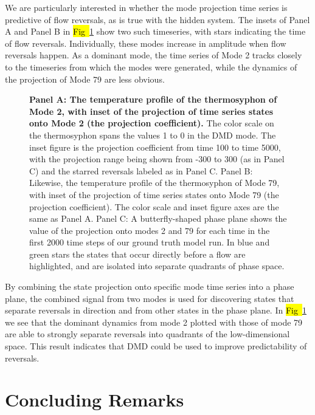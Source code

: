 \documentclass[10pt,letterpaper]{article}
\begin{document}
We are particularly interested in whether the mode projection time series is predictive of flow reversals, as is true with the hidden system.
The insets of Panel A and Panel B in \hl{Fig~}\ref{fig:DMD_phaseplane} show two such timeseries, with stars indicating the time of flow reversals.
Individually, these modes increase in amplitude when flow reversals happen.
As a dominant mode, the time series of Mode 2 tracks closely to the timeseries from which the modes were generated, while the dynamics of the projection of Mode 79 are less obvious.

\begin{figure}[h]
  \centering
  \caption[]{
\textbf{    Panel A: The temperature profile of the thermosyphon of Mode 2, with inset of the projection of time series states onto Mode 2 (the projection coefficient).
}    The color scale on the thermosyphon spans the values 1 to 0 in the DMD mode.
    The inset figure is the projection coefficient from time 100 to time 5000, with the projection range being shown from -300 to 300 (as in Panel C) and the starred reversals labeled as in Panel C.
    Panel B: Likewise, the temperature profile of the thermosyphon of Mode 79, with inset of the projection of time series states onto Mode 79 (the projection coefficient).
    The color scale and inset figure axes are the same as Panel A.
    Panel C: A butterfly-shaped phase plane shows the value of the projection onto modes 2 and 79 for each time in the first 2000 time steps of our ground truth model run.
    In blue and green stars the states that occur directly before a flow are highlighted, and are isolated into separate quadrants of phase space.
  }
  \label{fig:DMD_phaseplane}
\end{figure}

By combining the state projection onto specific mode time series into a phase plane, the combined signal from two modes is used for discovering states that separate reversals in direction and from other states in the phase plane.
In \hl{Fig~}\ref{fig:DMD_phaseplane} we see that the dominant dynamics from mode 2 plotted with those of mode 79 are able to strongly separate reversals into quadrants of the low-dimensional space.
This result indicates that DMD could be used to improve predictability of reversals.

\section*{Concluding Remarks}
\end{document}
